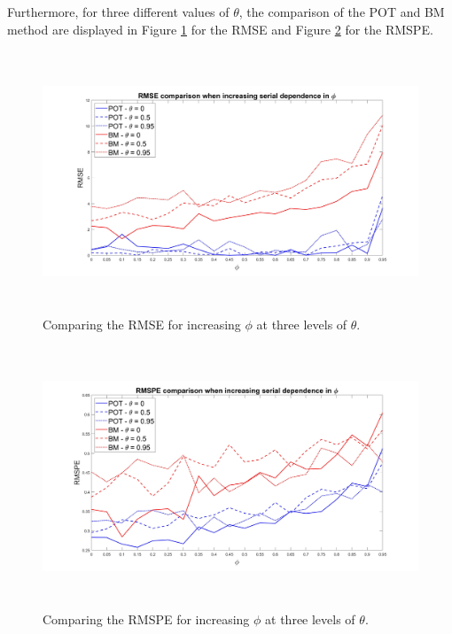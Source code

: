\documentclass[a4paper,12pt]{article}
\theoremstyle{plain}
\begin{document}
Furthermore, for three different values of $\theta$, the comparison of the POT and BM method are displayed in Figure \ref{fig:results_rmse_arma_phi_increase} for the RMSE and Figure \ref{fig:results_mape_arma_phi_increase} for the RMSPE.

\begin{figure}[H]
\includegraphics[height=7.8cm, width=\linewidth]{Figures/results_rmse_arma_phi_increase.jpg}
\vspace{-0.8cm}
\captionsetup[figure]{font=small,labelfont=small}
\caption{Comparing the RMSE for increasing $\phi$ at three levels of $\theta$.}
\label{fig:results_rmse_arma_phi_increase}
\end{figure}

\begin{figure}[H]
\includegraphics[height=7.8cm, width=\linewidth]{Figures/results_mape_arma_phi_increase.jpg}
\vspace{-0.8cm}
\captionsetup[figure]{font=small,labelfont=small}
\caption{Comparing the RMSPE for increasing $\phi$ at three levels of $\theta$.}
\label{fig:results_mape_arma_phi_increase}
\end{figure}
\end{document}
